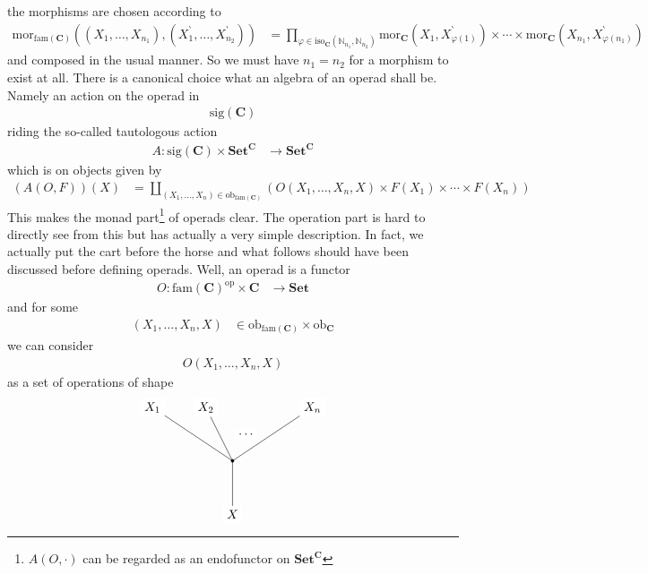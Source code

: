 the morphisms are chosen according to
\begin{align*}
  \mathrm{mor}_{\mathrm{fam}(\mathbf{C})}
  \left(
    (X_{1},\ldots,X_{n_{1}}),
    (X_{1}^{\backprime},\ldots,X_{n_{2}}^{\backprime})
  \right)
  &=
  \prod_{\varphi \in \mathrm{iso}_{\mathbf{C}}(\mathbb{N}_{n_{1}},\mathbb{N}_{n_{2}})}
  \mathrm{mor}_{\mathbf{C}}(X_{1},X_{\varphi(1)}^{\backprime})
  \times
  \cdots
  \times
  \mathrm{mor}_{\mathbf{C}}(X_{n_{1}},X_{\varphi(n_{1})}^{\backprime})
\end{align*}
and composed in the usual manner. So we must have $n_{1} = n_{2}$ for a morphism to exist at all. There is a canonical choice what an algebra of an operad shall be. Namely an action on the operad in 
\begin{align*}
  \mathrm{sig}(\mathbf{C})
\end{align*}
riding the so-called tautologous action
\begin{align*}
  A
  \colon
  \mathrm{sig}(\mathbf{C})
  \times
  \mathbf{Set}^{\mathbf{C}}
  &\rightarrow
  \mathbf{Set}^{\mathbf{C}}
\end{align*}
which is on objects given by
\begin{align*}
  \left(
    A(O,F)
  \right)
  (X)
  &=
  \coprod_{(X_{1},\ldots,X_{n}) \in \mathrm{ob}_{\mathrm{fam}(\mathbf{C})}}
  \left(
    O(X_{1},\ldots,X_{n},X)
    \times
    F(X_{1})
    \times
    \cdots
    \times
    F(X_{n})
  \right)
\end{align*}
This makes the monad part\footnote{$A(O,\cdot)$ can be regarded as an endofunctor on $\mathbf{Set}^{\mathbf{C}}$} of operads clear. The operation part is hard to directly see from this but has actually a very simple description. In fact, we actually put the cart before the horse and what follows should have been discussed before defining operads. Well, an operad is a functor
\begin{align*}
  O
  \colon
  \mathrm{fam}(\mathbf{C})^{\mathrm{op}}
  \times
  \mathbf{C}
  &\rightarrow
  \mathbf{Set}
\end{align*}
and for some
\begin{align*}
  (X_{1},\ldots,X_{n},X)
  &\in
  \mathrm{ob}_{\mathrm{fam}(\mathbf{C})}
  \times
  \mathrm{ob}_{\mathbf{C}}
\end{align*}
we can consider
\begin{align*}
  O(X_{1},\ldots,X_{n},X)
\end{align*}
as a set of operations of shape
\[
\begin{tikzpicture}[scale=0.75]
  \filldraw
    (0,0) node[fill=white] {$X$}
    --
    (0,2) circle (1.5pt) node[below right] {};
  \draw
    (0,2)
    --
    (-3,4) node[fill=white] {$X_{1}$};
  \draw
    (0,2)
    --
    (-1,4) node[fill=white] {$X_{2}$};
  \draw
    (0.5,3)
    --
    (0.5,3) node[fill=white] {$\ldots$};
  \draw
    (0,2)
    --
    (3,4) node[fill=white] {$X_{n}$};
\end{tikzpicture}
\]
